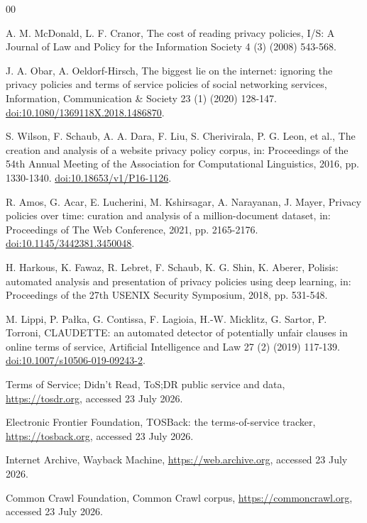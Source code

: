\documentclass[preprint,12pt,a4paper]{elsarticle}
\begin{document}
\begin{thebibliography}{00}

A. M. McDonald, L. F. Cranor, The cost of reading privacy policies,
I/S: A Journal of Law and Policy for the Information Society 4 (3) (2008) 543-568.

J. A. Obar, A. Oeldorf-Hirsch, The biggest lie on the internet: ignoring the
privacy policies and terms of service policies of social networking services,
Information, Communication \& Society 23 (1) (2020) 128-147.
\href{https://doi.org/10.1080/1369118X.2018.1486870}{doi:10.1080/1369118X.2018.1486870}.

S. Wilson, F. Schaub, A. A. Dara, F. Liu, S. Cherivirala, P. G. Leon, et al.,
The creation and analysis of a website privacy policy corpus, in: Proceedings
of the 54th Annual Meeting of the Association for Computational Linguistics,
2016, pp. 1330-1340.
\href{https://doi.org/10.18653/v1/P16-1126}{doi:10.18653/v1/P16-1126}.

R. Amos, G. Acar, E. Lucherini, M. Kshirsagar, A. Narayanan, J. Mayer, Privacy
policies over time: curation and analysis of a million-document dataset, in:
Proceedings of The Web Conference, 2021, pp. 2165-2176.
\href{https://doi.org/10.1145/3442381.3450048}{doi:10.1145/3442381.3450048}.

H. Harkous, K. Fawaz, R. Lebret, F. Schaub, K. G. Shin, K. Aberer, Polisis:
automated analysis and presentation of privacy policies using deep learning,
in: Proceedings of the 27th USENIX Security Symposium, 2018, pp. 531-548.

M. Lippi, P. Pa\l{}ka, G. Contissa, F. Lagioia, H.-W. Micklitz, G. Sartor,
P. Torroni, CLAUDETTE: an automated detector of potentially unfair clauses in
online terms of service, Artificial Intelligence and Law 27 (2) (2019) 117-139.
\href{https://doi.org/10.1007/s10506-019-09243-2}{doi:10.1007/s10506-019-09243-2}.

Terms of Service; Didn't Read, ToS;DR public service and data,
\url{https://tosdr.org}, accessed 23 July 2026.

Electronic Frontier Foundation, TOSBack: the terms-of-service tracker,
\url{https://tosback.org}, accessed 23 July 2026.

Internet Archive, Wayback Machine, \url{https://web.archive.org}, accessed 23
July 2026.

Common Crawl Foundation, Common Crawl corpus,
\url{https://commoncrawl.org}, accessed 23 July 2026.


\end{thebibliography}
\end{document}
